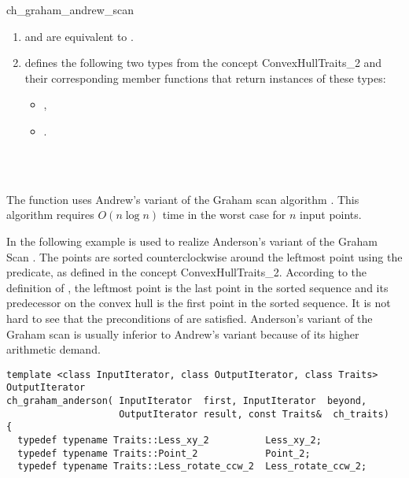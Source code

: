 \begin{ccRefFunction}{ch_graham_andrew_scan}
\begin{enumerate}
   \item    {} and 
            are equivalent to .
   \item    {} defines the following two types from
            the concept ConvexHullTraits\_2 and their corresponding member
            functions that return instances of these types:
            \begin{itemize}
                \item {},
                \item {}.
            \end{itemize}
\end{enumerate}


\ccSeeAlso

 \\
 \\

\ccImplementation

The function uses Andrew's 
variant of the Graham scan algorithm \cite{a-aeach-79} . This algorithm 
requires $O(n \log n)$ time in the worst case for $n$ input points.  

\ccExample

In the following example  is used to
realize Anderson's variant \cite{a-readc-78} of the Graham Scan 
\cite{g-eadch-72}.  The points are sorted counterclockwise around the leftmost 
point using the  predicate, as defined in
the concept ConvexHullTraits\_2. According to the definition 
of , the leftmost point is the last point in the sorted 
sequence and its predecessor on the convex hull is the first point in the 
sorted sequence.  It is not hard to see that the preconditions of
 are satisfied.  Anderson's variant of the 
Graham scan is usually inferior to Andrew's variant because of its higher 
arithmetic demand.

\begin{verbatim}
template <class InputIterator, class OutputIterator, class Traits>
OutputIterator
ch_graham_anderson( InputIterator  first, InputIterator  beyond,
                    OutputIterator result, const Traits&  ch_traits)
{
  typedef typename Traits::Less_xy_2          Less_xy_2;
  typedef typename Traits::Point_2            Point_2;
  typedef typename Traits::Less_rotate_ccw_2  Less_rotate_ccw_2;


\end{verbatim}
\end{ccRefFunction}
